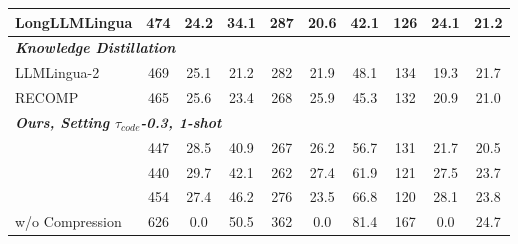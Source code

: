 \begin{table*}[]
\begin{tabular}{lccccccccc}
\multicolumn{1}{l}{LongLLMLingua}                    & 474                & 24.2                         & 34.1                                        & 287                & 20.6                         & 42.1              & 126                & 24.1                & 21.2               \\ \hline
\multicolumn{7}{l}{\textit{\textbf{Knowledge Distillation}}}                                                                                                                                                                              & \textit{\textbf{}} &                     & \textit{\textbf{}} \\
\multicolumn{1}{l}{LLMLingua-2}                      & 469                & 25.1                         & 21.2                                        & 282               & 21.9                         & 48.1              & 134                & 19.3                & 21.7               \\
\multicolumn{1}{l}{RECOMP}                           & 465                & 25.6                         & 23.4                                        & 268                & 25.9                         & 45.3              & 132                & 20.9                & 21.0               \\ \hline
\multicolumn{7}{l}{\textit{\textbf{Ours, Setting $\tau_{code}$-0.3, 1-shot}}}                                                                                                                                                     & \textit{\textbf{}} &                     & \textit{\textbf{}} \\
\rowcolor[HTML]{EFEFEF}
\multicolumn{1}{l}{\ourtool w/o Copy} & 447                & 28.5                         & 40.9                                        & 267                & 26.2                         & 56.7              & 131                & 21.7                & 20.5               \\
\rowcolor[HTML]{EFEFEF}
\multicolumn{1}{l}{\ourtool}          & 440                & 29.7                         & 42.1                                        & 262                & 27.4                        & 61.9              & 121               & 27.5                & 23.7               \\ 
\rowcolor[HTML]{F4E5BF}
\multicolumn{1}{l}{Oracle}                           & 454                & 27.4                         & 46.2                                      & 276                & 23.5                         & 66.8              & 120                & 28.1                & 23.8               \\ \hline
\multicolumn{1}{l}{w/o Compression}                  & 626                & 0.0                          & 50.5                                        & 362                & 0.0                       & 81.4              & 167                & 0.0                 & 24.7               \\ \hline
\end{tabular}
\vspace{-0.2in}
\end{table*}

